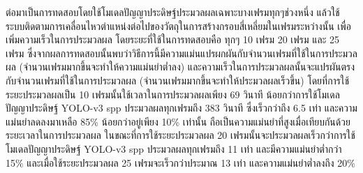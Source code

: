 ต่อมาเป็นการทดสอบโดยใช้โมเดลปัญญาประดิษฐ์ประมวลผลเฉพาะบางเฟรมทุกๆช่วงหนึ่ง แล้วใช้ระบบติดตามการเคลื่อนไหวตำแหน่งต่อไปของวัตถุในการสร้างกรอบสี่เหลี่ยมในเฟรมระหว่างนั้น เพื่อเพิ่มความเร็วในการประมวลผล 
โดยระยะที่ใช้ในการทดสอบคือ ทุกๆ 10 เฟรม 20 เฟรม และ 25 เฟรม ซึ่งจากผลการทดสอบนั้นพบว่าวิธีการนี้มีความแม่นแปรผกผันกับจำนวนเฟรมที่ใช้ในการประมวลผล (จำนวนเฟรมมากขึ้นจะทำให้ความแม่นยำต่ำลง) 
และความเร็วในการประมวลผลนั้นจะแปรผันตรงกับจำนวนเฟรมที่ใช้ในการประมวลผล (จำนวนเฟรมมากขึ้นจะทำให้ประมวลผลเร็วขึ้น) โดยที่การใช้ระยะประมวลผลเป็น 10 เฟรมนั้นใช้เวลาในการประมวลผลเพียง 69 วินาที 
น้อยกว่าการใช้โมเดลปัญญาประดิษฐ์ YOLO-v3 spp ประมวลผลทุกเฟรมถึง 383 วินาที ซึ่งเร็วกว่าถึง 6.5 เท่า และความแม่นยำลดลงมาเหลือ 85\% น้อยกว่าอยู่เพียง 10\% เท่านั้น ถือเป็นความแม่นยำที่สูงเมื่อเทียบกันด้วยระยะเวลาในการประมวลผล
ในขณะที่การใช้ระยะประมวลผล 20 เฟรมนั้นจะประมวลผลเร็วกว่าการใช้โมเดลปัญญาประดิษฐ์ YOLO-v3 spp ประมวลผลทุกเฟรมถึง 11 เท่า และมีความแม่นยำต่ำกว่า 15\%
และเมื่อใช้ระยะประมวลผล 25 เฟรมจะเร็วกว่าประมาณ 13 เท่า และความแม่นยำต่ำลงถึง 20\% 